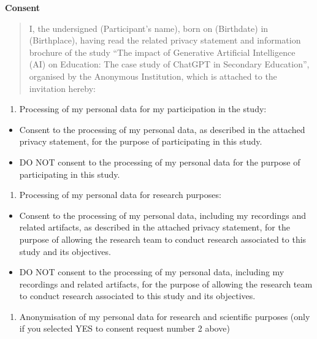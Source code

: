 \documentclass[
  11pt,
]{article}
\providecommand{\tightlist}{%
  \setlength{\itemsep}{0pt}\setlength{\parskip}{0pt}}
\begin{document}
\textbf{Consent}

\begin{quote}
I, the undersigned (Participant's name), born on (Birthdate) in (Birthplace), having read the related privacy statement and information brochure of the study ``The impact of Generative Artificial Intelligence (AI) on Education: The case study of ChatGPT in Secondary Education'', organised by the Anonymous Institution, which is attached to the invitation hereby:
\end{quote}

\begin{enumerate}
\def\labelenumi{(\arabic{enumi})}
\tightlist
\item
  Processing of my personal data for my participation in the study:
\end{enumerate}

\begin{itemize}
\tightlist
\item[$\square$]
  Consent to the processing of my personal data, as described in the attached privacy statement, for the purpose of participating in this study.
\item[$\square$]
  DO NOT consent to the processing of my personal data for the purpose of participating in this study.
\end{itemize}

\begin{enumerate}
\def\labelenumi{(\arabic{enumi})}
\setcounter{enumi}{1}
\tightlist
\item
  Processing of my personal data for research purposes:
\end{enumerate}

\begin{itemize}
\tightlist
\item[$\square$]
  Consent to the processing of my personal data, including my recordings and related artifacts, as described in the attached privacy statement, for the purpose of allowing the research team to conduct research associated to this study and its objectives.
\item[$\square$]
  DO NOT consent to the processing of my personal data, including my recordings and related artifacts, for the purpose of allowing the research team to conduct research associated to this study and its objectives.
\end{itemize}

\begin{enumerate}
\def\labelenumi{(\arabic{enumi})}
\setcounter{enumi}{2}
\tightlist
\item
  Anonymisation of my personal data for research and scientific purposes (only if you selected YES to consent request number 2 above)
\end{enumerate}
\end{document}
